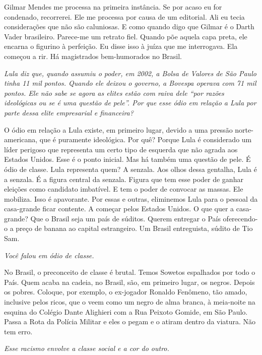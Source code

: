 \normalfont
Gilmar Mendes me processa na primeira instância. Se por
acaso eu for condenado, recorrerei. Ele me processa por causa de um
editorial. Ali eu tecia considerações que não são caluniosas. E como
quando digo que Gilmar é o Darth Vader brasileiro. Parece-me um retrato
fiel. Quando põe aquela capa preta, ele encarna o figurino à perfeição.
Eu disse isso à juíza que me interrogava. Ela começou a rir. Há
magistrados bem-humorados no Brasil.

\itshape
 Lula diz que, quando assumiu o poder, em 2002, a Bolsa
de Valores de São Paulo tinha 11 mil pontos. Quando ele deixou o
governo, a Bovespa operava com 71 mil pontos. Ele não sabe se agora as
elites estão com raiva dele ``por razões ideológicas ou se é uma questão
de pele''. Por que esse ódio em relação a Lula por parte dessa elite
empresarial e financeira?

\normalfont
O ódio em relação a Lula existe, em primeiro lugar,
devido a uma pressão norte-americana, que é puramente ideológica.
\protect\hypertarget{_Hlk498163994}{}{}Por quê? Porque Lula é
considerado um líder perigoso que representa um certo tipo de esquerda
que não agrada aos Estados Unidos. Esse é o ponto inicial. Mas há também
uma questão de pele. É ódio de classe. Lula representa quem? A senzala.
Aos olhos dessa gentalha, Lula é a senzala. É a figura central da
senzala. Figura que tem esse poder de ganhar eleições como candidato
imbatível. E tem o poder de convocar as massas. Ele mobiliza. Isso é
apavorante. Por essas e outras, eliminemos Lula para o pessoal da
casa-grande ficar contente. A começar pelos Estados Unidos. O que quer a
casa-grande? Que o Brasil seja um país de súditos. Querem entregar o
País oferecendo-o a preço de banana ao capital estrangeiro. Um Brasil
entreguista, súdito de Tio Sam.

\itshape
 Você falou em ódio de classe.

\normalfont
No Brasil, o preconceito de classe é brutal. Temos
Sowetos espalhados por todo o País. Quem acaba na cadeia, no Brasil,
são, em primeiro lugar, os negros. Depois os pobres. Coloque, por
exemplo, o ex-jogador Ronaldo Fenômeno, tão amado, inclusive pelos
ricos, que o veem como um negro de alma branca, à meia-noite na esquina
do Colégio Dante Alighieri com a Rua Peixoto Gomide, em São Paulo. Passa
a Rota da Polícia Militar e eles o pegam e o atiram dentro da viatura.
Não tem erro.

\itshape
 Esse racismo envolve a classe social e a cor do outro.

